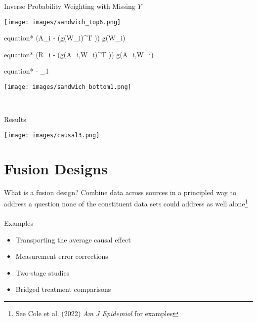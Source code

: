 \documentclass{beamer}
\begin{document}
\begin{frame}{Inverse Probability Weighting with Missing $Y$}
	\centering 
	\begin{center}
		\texttt{[image: images/sandwich\_top6.png]}
		\begin{empheq}[box=\bbox]{equation*}
			\left(A_i - (g(W_i)^T \hat{\alpha})\right) g(W_i)
		\end{empheq}
		\begin{empheq}[box=\violetbox]{equation*}
			\left(R_i - (g(A_i,W_i)^T \hat{\gamma})\right) g(A_i,W_i)
		\end{empheq}
		\begin{empheq}[box=\wbox]{equation*}
			 - \hat{\mu}_1
		\end{empheq}
		\texttt{[image: images/sandwich\_bottom1.png]}
	\end{center}~\\
\end{frame}

\begin{frame}{Results}
	\begin{center}
		\texttt{[image: images/causal3.png]}
	\end{center}
\end{frame}

\section{Fusion Designs}

\begin{frame}{What is a fusion design?}
	Combine data across sources in a principled way to address a question none of the constituent data sets could address as well alone\footnote[frame]{See Cole et al. (2022) \textit{Am J Epidemiol} for examples}\\~\\
	Examples
	\begin{itemize}
		\item Transporting the average causal effect
		\item Measurement error corrections
		\item Two-stage studies
		\item Bridged treatment comparisons
	\end{itemize}
\end{frame}
\end{document}
